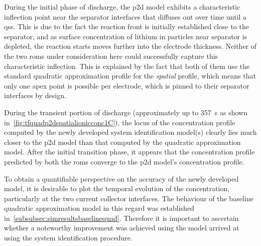 During  the  initial  phase  of   discharge,  the  \gls{p2d}  model  exhibits  a
characteristic inflection point near the  separator interfaces that diffuses out
over time  until a  \gls{qss}. This  is due to  the fact  the reaction  front is
initially established  close to the  separator, and as surface  concentration of
lithium  in particles  near separator  is  depleted, the  reaction starts  moves
further  into the  electrode thickness.  Neither  of the  two \glspl{rom}  under
consideration here  could successfully  capture this  characteristic inflection.
This is  explained by  the fact  that both  of them  use the  standard quadratic
approximation profile for the \emph{spatial}  profile, which means that only one
apex  point is  possible  per  electrode, which  is  pinned  to their  separator
interfaces by design.

During the transient portion of discharge (approximately up to \SI{357}{\second}
as   shown   in~\cref{fig:tfquadp2dspatialionicconc1C}),   the  locus   of   the
concentration  profile computed  by  the newly  developed system  identification
model(s) clearly lies  much closer to the \gls{p2d} model  than that computed by
the  quadratic  approximation model.  After  the  initial transition  phase,  it
appears  that  the  concentration  profile predicted  by  both  the  \glspl{rom}
converge to the \gls{p2d} model's concentration profile.


To obtain  a quantifiable  perspective on  the accuracy  of the  newly developed
model, it  is desirable  to plot  the temporal  evolution of  the concentration,
particularly  at  the  two  current   collector  interfaces.  The  behaviour  of
the  baseline  quadratic approximation  model  in  this regard  was  established
in~\cref{subsubsec:simresultsbaselinequad}.   Therefore  it   is  important   to
ascertain whether a noteworthy improvement  was achieved using the model arrived
at using the system identification procedure.

